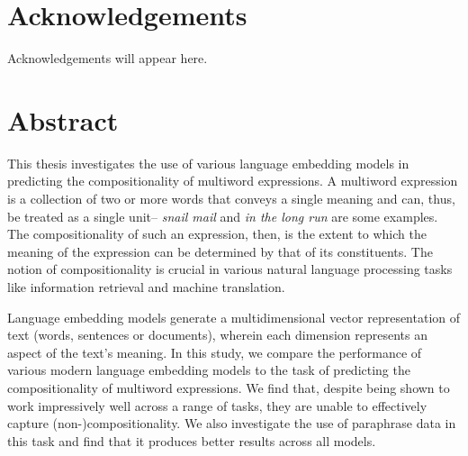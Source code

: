 \documentclass[12pt,a4paper, margin=1in]{report}
\begin{document}
\chapter*{\centering \LARGE Acknowledgements}
Acknowledgements will appear here.

\chapter*{\centering \LARGE Abstract}
This thesis investigates the use of various language embedding models in predicting the compositionality of multiword expressions. 
A multiword expression is a collection of two or more words that conveys a single meaning and can, thus, be treated as a single unit-- \textit{snail mail} and \textit{in the long run} are some examples. The compositionality of such an expression, then, is the extent to which the meaning of the expression can be determined by that of its constituents. The notion of compositionality is crucial in various natural language processing tasks like information retrieval and machine translation.

 Language embedding models generate a multidimensional vector representation of text (words, sentences or documents), wherein each dimension represents an aspect of the text's meaning. In this study, we compare the performance of various modern language embedding models to the task of predicting the compositionality of multiword expressions. We find that, despite being shown to work impressively well across a range of tasks, they are unable to effectively capture (non-)compositionality. We also investigate the use of paraphrase data in this task and find that it produces better results across all models.
\end{document}
